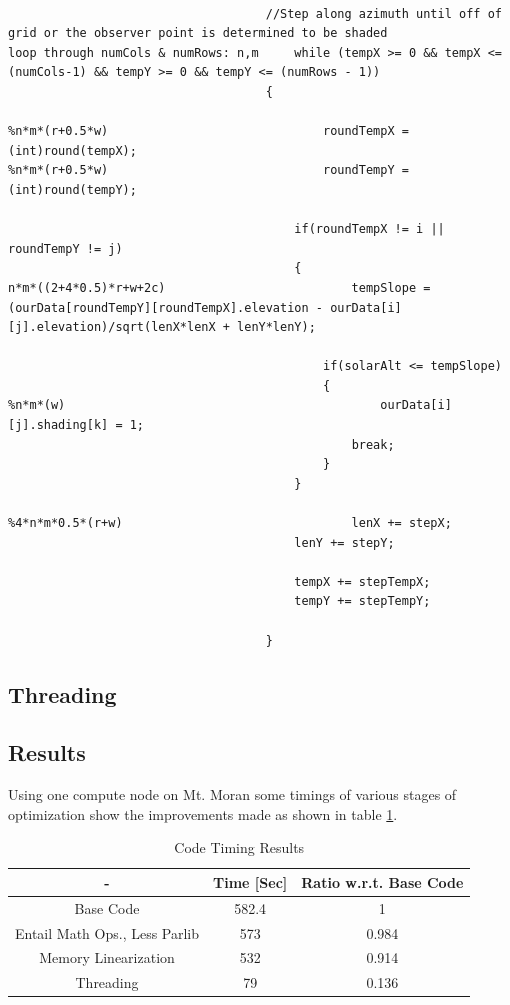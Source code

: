 \documentclass[]{article}%
\begin{document}
{\small
\begin{verbatim}

									//Step along azimuth until off of grid or the observer point is determined to be shaded
loop through numCols & numRows: n,m		while (tempX >= 0 && tempX <= (numCols-1) && tempY >= 0 && tempY <= (numRows - 1))
									{	
									
%n*m*(r+0.5*w)								roundTempX = (int)round(tempX);
%n*m*(r+0.5*w)								roundTempY = (int)round(tempY);			
									
										if(roundTempX != i ||  roundTempY != j) 
										{
n*m*((2+4*0.5)*r+w+2c)							tempSlope = (ourData[roundTempY][roundTempX].elevation - ourData[i][j].elevation)/sqrt(lenX*lenX + lenY*lenY);	
									
											if(solarAlt <= tempSlope)
											{	
%n*m*(w)											ourData[i][j].shading[k] = 1;
												break;
											}
										}												
									
%4*n*m*0.5*(r+w)								lenX += stepX;		
										lenY += stepY;
									
										tempX += stepTempX;
										tempY += stepTempY;
									
									}
\end{verbatim}}

\subsection{Threading}






\subsection{Results}

Using one compute node on Mt. Moran some timings of various stages of optimization show the improvements made as shown in table \ref{table:code_timing}.

\begin{table}[ht]
\caption{Code Timing Results}
\centering
\begin{tabular}{c c c}
\hline\hline
 - & Time [Sec]& Ratio w.r.t. Base Code \\ [0.5ex] 
\hline
Base Code & 582.4 & 1 \\ 
Entail Math Ops., Less Parlib & 573 & 0.984\\
Memory Linearization & 532 & 0.914\\
Threading & 79 & 0.136\\
\hline
\end{tabular}
\label{table:code_timing}
\end{table} 
\end{document}
